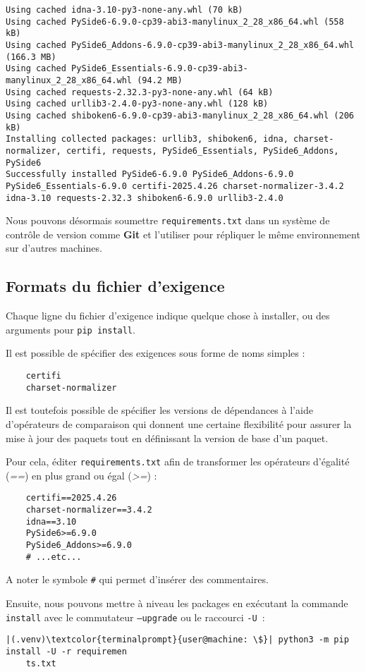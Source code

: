 \begin{lstlisting}[style=terminal]
Using cached idna-3.10-py3-none-any.whl (70 kB)
Using cached PySide6-6.9.0-cp39-abi3-manylinux_2_28_x86_64.whl (558 kB)
Using cached PySide6_Addons-6.9.0-cp39-abi3-manylinux_2_28_x86_64.whl (166.3 MB)
Using cached PySide6_Essentials-6.9.0-cp39-abi3-manylinux_2_28_x86_64.whl (94.2 MB)
Using cached requests-2.32.3-py3-none-any.whl (64 kB)
Using cached urllib3-2.4.0-py3-none-any.whl (128 kB)
Using cached shiboken6-6.9.0-cp39-abi3-manylinux_2_28_x86_64.whl (206 kB)
Installing collected packages: urllib3, shiboken6, idna, charset-normalizer, certifi, requests, PySide6_Essentials, PySide6_Addons, PySide6
Successfully installed PySide6-6.9.0 PySide6_Addons-6.9.0 PySide6_Essentials-6.9.0 certifi-2025.4.26 charset-normalizer-3.4.2 idna-3.10 requests-2.32.3 shiboken6-6.9.0 urllib3-2.4.0
\end{lstlisting}

Nous pouvons désormais soumettre \texttt{requirements.txt} dans un système de contrôle de version comme \textbf{Git} et l’utiliser pour répliquer le même environnement sur d’autres machines.

\subsection*{Formats du fichier d'exigence}
Chaque ligne du fichier d'exigence indique quelque chose à installer, ou des arguments pour \texttt{pip install}.

Il est possible de spécifier des exigences sous forme de noms simples :
\begin{verbatim}
    certifi
    charset-normalizer
\end{verbatim}

Il est toutefois possible de spécifier les versions de dépendances à l’aide d’opérateurs de comparaison qui donnent une certaine flexibilité pour assurer la mise à jour des paquets tout en définissant la version de base d’un paquet.

Pour cela, éditer \texttt{requirements.txt} afin de transformer les opérateurs d’égalité (\textit{==}) en plus grand ou égal  (\textit{>=}) :
\begin{verbatim}
    certifi==2025.4.26
    charset-normalizer==3.4.2
    idna==3.10
    PySide6>=6.9.0
    PySide6_Addons>=6.9.0
    # ...etc...
\end{verbatim}

A noter le symbole \texttt{\#} qui permet d'insérer des commentaires.

Ensuite, nous pouvons mettre à niveau les packages en exécutant la commande \texttt{install} avec le commutateur \texttt{--upgrade} ou le raccourci \texttt{-U} :
\begin{lstlisting}[style=terminal]
|(.venv)\textcolor{terminalprompt}{user@machine: \$}| python3 -m pip install -U -r requiremen
    ts.txt
\end{lstlisting}


